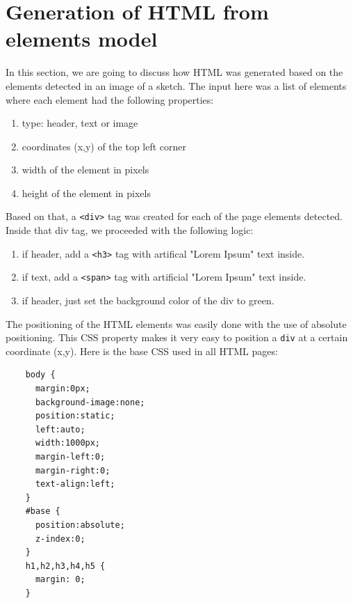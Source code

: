 \documentclass[]{IEEEtran}
\begin{document}
  \section{Generation of HTML from elements model}
  In this section, we are going to discuss how HTML was generated based on the elements detected in an image of a sketch. The input here was a list of elements where each element had the following properties:
  
\begin{enumerate}
\item type: header, text or image
\item coordinates (x,y) of the top left corner
\item width of the element in pixels
\item height of the element in pixels
\end{enumerate}

Based on that, a \texttt{<div>} tag was created for each of the page elements detected. Inside that div tag, we proceeded with the following logic:
\begin{enumerate}
\item if header, add a \texttt{<h3>} tag with artifical "Lorem Ipsum" text inside.
\item if text, add a \texttt{<span>} tag with artificial "Lorem Ipsum" text inside.
\item if header, just set the background color of the div to green.
\end{enumerate}

The positioning of the HTML elements was easily done with the use of absolute positioning. This CSS property makes it very easy to position a \texttt{div} at a certain coordinate (x,y). Here is the base CSS used in all HTML pages:
\begin{verbatim}
    body {
      margin:0px;
      background-image:none;
      position:static;
      left:auto;
      width:1000px;
      margin-left:0;
      margin-right:0;
      text-align:left;
    }
    #base {
      position:absolute;
      z-index:0;
    }
    h1,h2,h3,h4,h5 {
      margin: 0;
    }
\end{verbatim}
\end{document}
